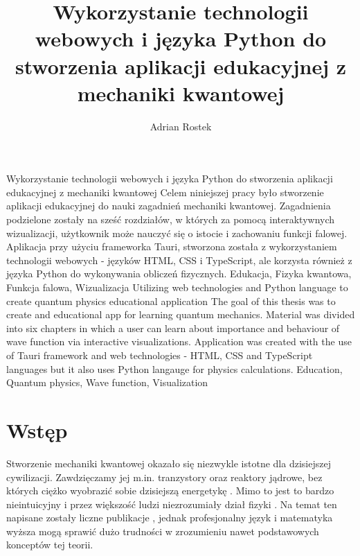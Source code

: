 \documentclass{SGGW-thesis}
\title{Wykorzystanie technologii webowych i języka Python do stworzenia aplikacji edukacyjnej z mechaniki kwantowej}
\author{Adrian Rostek}
\begin{document}
\maketitle
\statementpage
\abstractpage
{Wykorzystanie technologii webowych i języka Python do stworzenia aplikacji edukacyjnej z mechaniki kwantowej}
{Celem niniejszej pracy było stworzenie aplikacji edukacyjnej do nauki zagadnień mechaniki kwantowej. Zagadnienia podzielone zostały na sześć rozdziałów, w których za pomocą interaktywnych wizualizacji, użytkownik może nauczyć się o istocie i zachowaniu funkcji falowej. Aplikacja przy użyciu frameworka Tauri, stworzona została z wykorzystaniem technologii webowych - języków HTML, CSS i TypeScript, ale korzysta również z języka Python do wykonywania obliczeń fizycznych.}
{Edukacja, Fizyka kwantowa, Funkcja falowa, Wizualizacja}
{Utilizing web technologies and Python language to create quantum physics educational application}
{The goal of this thesis was to create and educational app for learning quantum mechanics. Material was divided into six chapters in which a user can learn about importance and behaviour of wave function via interactive visualizations. Application was created with the use of Tauri framework and web technologies - HTML, CSS and TypeScript languages but it also uses Python langauge for physics calculations.}
{Education, Quantum physics, Wave function, Visualization}


{
  \doublespacing
  \tableofcontents
}

\startchapterfromoddpage %

\chapter{Wstęp}
Stworzenie mechaniki kwantowej okazało się niezwykle istotne dla dzisiejszej cywilizacji. Zawdzięczamy jej m.in. tranzystory oraz reaktory jądrowe, bez których ciężko wyobrazić sobie dzisiejszą energetykę \cite{nuclear-stats}. Mimo to jest to bardzo nieintuicyjny i przez większość ludzi niezrozumiały dział fizyki \cite{fiz atom}. Na temat ten napisane zostały liczne publikacje \cite{fiz atom} \cite{mechanika kwant} \cite{fiz kwant}, jednak profesjonalny język i matematyka wyższa mogą sprawić dużo trudności w zrozumieniu nawet podstawowych konceptów tej teorii.
\end{document}
